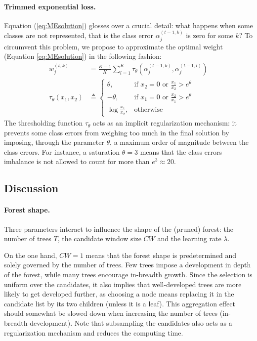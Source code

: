\documentclass{article}
\begin{document}
\paragraph{Trimmed exponential loss.}
Equation (\ref{eq:MEsolution}) glosses over a crucial detail: what happens when 
some classes are not represented, that is the class error $\alpha_j^{(t-1, k)}$ 
is zero for some $k$? To circumvent this problem, we propose to approximate the 
optimal weight (Equation \ref{eq:MEsolution}) in the following fashion:
\begin{align}\label{eq:METrimmed}
w_j^{(t,k)} &= \frac{K-1}{K} \sum_{l=1}^{K} \tau_{\theta} \left(\alpha_j^{(t-1, 
k)},  \alpha_j^{(t-1, l)}\right)\\
\tau_{\theta}(x_1, x_2) &\triangleq \begin{cases}
    \theta, & \text{if $x_2 = 0$ or $\frac{x_1}{x_2} > e^{\theta}$}\\
    -\theta,& \text{if $x_1 = 0$ or $\frac{x_2}{x_1} > e^{\theta}$}\\
    \log \frac{x_1}{x_2}, & \text{otherwise}
  \end{cases}
\end{align}
The thresholding function $\tau_{\theta}$ acts as an implicit regularization 
mechanism: it prevents some class errors from weighing too much in the final 
solution by imposing, through the parameter $\theta$, a maximum order of magnitude between the class errors. %
For instance, a saturation $\theta=3$ means that the class errors imbalance is 
not allowed to count for more than $e^3 \approx 20$. 

\subsection{Discussion}
\label{subsec:discussparams}

\paragraph{Forest shape.}
Three parameters interact to influence the shape of the (pruned)
forest: the number of trees $T$, the candidate window size $CW$ and
the learning rate $\lambda$.

On the one hand, $CW=1$ means that the forest shape is predetermined and 
solely governed by the number of trees. Few trees impose a development in 
depth of the forest, while many trees encourage in-breadth growth. Since the 
selection is uniform over the candidates, it also implies that well-developed 
trees are more likely to get developed further, as choosing a node means 
replacing it in the candidate list by its two children (unless it is a leaf). 
This aggregation effect should somewhat be slowed down when increasing the 
number of trees (in-breadth development). Note that subsampling the candidates 
also acts as a regularization mechanism and reduces the computing time.
\end{document}
